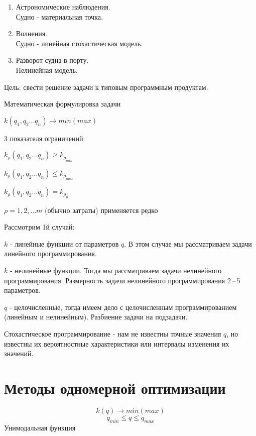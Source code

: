 \documentclass[12pt,a5paper]{scrbook}
\begin{document}
  \begin{enumerate}
    \item Астрономические наблюдения.\\Судно - материальная точка.
    \item Волнения.\\Судно - линейная стохастическая модель.
    \item Разворот судна в порту.\\Нелинейная модель.
  \end{enumerate}\par
  Цель: свести решение задачи к типовым программным продуктам.\par
  Математическая формулировка задачи\par
  \(
  k(q_1, q_2\ldots q_n)\to min (max)
  \)
  \par
  3 показателя ограничений:\par
  \(
  k_{\rho}(q_1, q_2\ldots q_n)\geq k_{\rho_{min}}
  \)\par
  \(
  k_{\rho}(q_1, q_2\ldots q_n)\leq k_{\rho_{max}}
  \)\par
  \(
  k_{\rho}(q_1, q_2\ldots q_n) = k_{\rho_{0}}
  \)\par
  $\rho = 1, 2, \ldots m$ (обычно затраты) применяется редко\par
  Рассмотрим 1й случай:\par
  $k$ - линейные функции от параметров $q$. В этом случае мы рассматриваем задачи линейного программирования.\par
  $k$ - нелинейные функции. Тогда мы рассматриваем задачи нелинейного программирования. Размерность задачи нелинейного программирования 2\,--\,5 параметров.\par
  $q$ - целочисленные, тогда имеем дело с целочисленным программированием (линейным и нелинейным). Разбиение задачи на подзадачи.\par
  Стохастическое программирование - нам не известны точные значения $q$, но известны их вероятностные характеристики или интервалы изменения их значений.\par
  \chapter{Методы одномерной оптимизации}
  \pagestyle{headings}
  $$k(q)\to min(max)$$
  $$q_{min}\leq q \leq q_{max}$$
  Унимодальная функция
  \begin{figure}[h]
  \end{figure}
\end{document}
